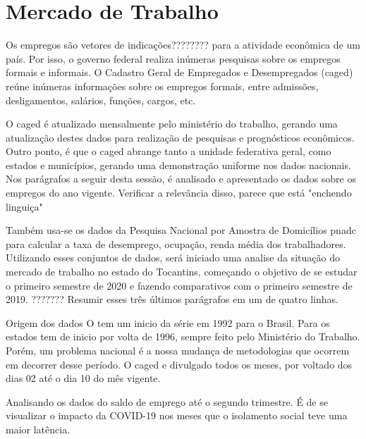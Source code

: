 \chapter{Mercado de Trabalho}

\par Os empregos são {\color{red}vetores de indicações????????} para a atividade econômica de um país. Por isso, o governo federal realiza inúmeras pesquisas sobre os empregos formais e informais. O Cadastro Geral de Empregados e Desempregados (\acrshort{caged}) reúne inúmeras informações sobre os empregos formais, entre admissões, desligamentos, salários, funções, cargos, etc.
\par O \acrshort{caged} é atualizado mensalmente pelo ministério do trabalho, gerando uma atualização destes dados para realização de pesquisas e prognósticos econômicos. Outro ponto, é que o \acrshort{caged} abrange tanto a unidade federativa geral, como estados e municípios, gerando uma demonstração uniforme nos dados nacionais. Nos parágrafos a seguir desta sessão, é analisado e apresentado os dados sobre os empregos do ano vigente. Verificar a relevância disso, parece que está "enchendo linguiça"
\par Também usa-se os dados da Pesquisa Nacional por Amostra de Domicílios \acrshort{pnadc} para calcular a taxa de desemprego, ocupação, renda média dos trabalhadores. Utilizando esses conjuntos de dados, será iniciado uma analise da situação do mercado de trabalho no estado do Tocantins, começando  o objetivo de se estudar o primeiro semestre de 2020 e fazendo comparativos com o primeiro semestre de 2019. {\color{red}??????? Resumir esses três últimos parágrafos em um de quatro linhas.}

\begin{smbox}[label={labelbox},nameref={Empregos}]{Origem dos dados}
	O  tem um inicio da série em 1992 para o Brasil. Para os estados tem de inicio por volta de 1996, sempre feito pelo Ministério do Trabalho. Porém, um problema nacional é a nossa mudança de metodologias que ocorrem em decorrer desse período. O \acrshort{caged} e divulgado todos os meses, por voltado dos dias 02 até o dia 10 do mês vigente.
\end{smbox}

\par Analisando os dados do saldo de emprego até o segundo trimestre. É de se visualizar o impacto da COVID-19 nos meses que o isolamento social teve uma maior latência.


